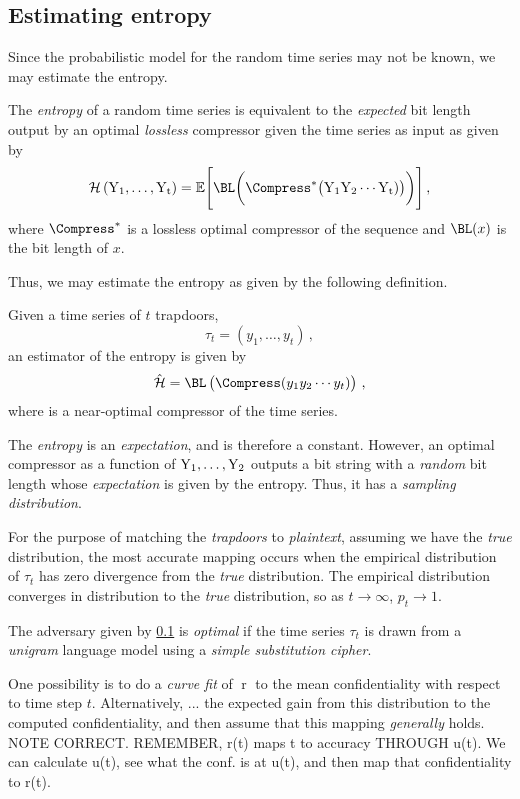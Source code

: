 \documentclass[ ../main.tex]{subfiles}
\begin{document}
\subsection{Estimating entropy}
Since the probabilistic model for the random time series may not be known, we may estimate the entropy.
\begin{postulate}
\label{post:optcomp}
The \emph{entropy} of a random time series is equivalent to the \emph{expected} bit length output by an optimal \emph{lossless} compressor given the time series as input as given by
\begin{equation}
    \entropy\left(\rv{Y_1},\ldots,\rv{Y_t}\right) =
    \expectation\Biggl[
        \BL\biggl(
            \Compress^*\bigl(
                \rv{Y_1} \rv{Y_2} \cdots \rv{Y_t}
                )
            \bigr)
        \biggr)
    \Biggr]\,,
\end{equation}
where $\Compress^*$ is a lossless optimal compressor of the sequence and $\BL(x)$ is the bit length of $x$.
\end{postulate}

Thus, we may estimate the entropy as given by the following definition.
\begin{definition}
Given a time series of $t$ trapdoors,
\begin{equation}
    \tau_t = \left(y_1,\ldots,y_t\right)\,,
\end{equation}
an estimator of the entropy is given by
\begin{equation}
    \hat{\entropy} = \BL\left(\Compress(y_1 y_2 \cdots y_t)\right)\,,
\end{equation}
where \Compress is a near-optimal compressor of the time series.
\end{definition}

The \emph{entropy} is an \emph{expectation}, and is therefore a constant. However, an optimal compressor as a function of $\mathrm{Y_1},\ldots,\mathrm{Y_2}$ outputs a bit string with a \emph{random} bit length whose \emph{expectation} is given by the entropy. Thus, it has a \emph{sampling distribution}.

For the purpose of matching the \emph{trapdoors} to \emph{plaintext}, assuming we have the \emph{true} distribution, the most accurate mapping occurs when the empirical distribution of $\tau_t$ has zero divergence from the \emph{true} distribution. The empirical distribution converges in distribution to the \emph{true} distribution, so as $t \to \infty$, $p_t \to 1$.

The adversary given by \cref{} is \emph{optimal} if the time series $\tau_t$ is drawn from a \emph{unigram} language model using a \emph{simple substitution cipher}.

One possibility is to do a \emph{curve fit} of $\operatorname{r}$ to the mean confidentiality with respect to time step $t$. Alternatively, ... the expected gain from this distribution to the computed confidentiality, and then assume that this mapping \emph{generally} holds. NOTE CORRECT. REMEMBER, r(t) maps t to accuracy THROUGH u(t). We can calculate u(t), see what the conf. is at u(t), and then map that confidentiality to r(t).
\end{document}
